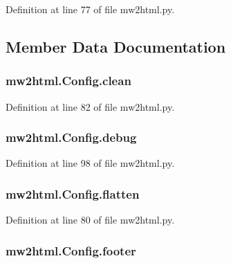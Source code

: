 Definition at line 77 of file mw2html.\+py.



\subsection{Member Data Documentation}
\subsubsection[{\texorpdfstring{clean}{clean}}]{\setlength{\rightskip}{0pt plus 5cm}mw2html.\+Config.\+clean}\hypertarget{classmw2html_1_1_config_ad74110e6433292bc02ca070147951816}{}\label{classmw2html_1_1_config_ad74110e6433292bc02ca070147951816}


Definition at line 82 of file mw2html.\+py.

\subsubsection[{\texorpdfstring{debug}{debug}}]{\setlength{\rightskip}{0pt plus 5cm}mw2html.\+Config.\+debug}\hypertarget{classmw2html_1_1_config_a52d34b7b74e4216fdedb0db8d01b1ca2}{}\label{classmw2html_1_1_config_a52d34b7b74e4216fdedb0db8d01b1ca2}


Definition at line 98 of file mw2html.\+py.

\subsubsection[{\texorpdfstring{flatten}{flatten}}]{\setlength{\rightskip}{0pt plus 5cm}mw2html.\+Config.\+flatten}\hypertarget{classmw2html_1_1_config_a68f835fe25e82cb83acfa34d24ea5423}{}\label{classmw2html_1_1_config_a68f835fe25e82cb83acfa34d24ea5423}


Definition at line 80 of file mw2html.\+py.

\subsubsection[{\texorpdfstring{footer}{footer}}]{\setlength{\rightskip}{0pt plus 5cm}mw2html.\+Config.\+footer}\hypertarget{classmw2html_1_1_config_ab13184eb1c700ebb989fa355221beb2d}{}\label{classmw2html_1_1_config_ab13184eb1c700ebb989fa355221beb2d}


